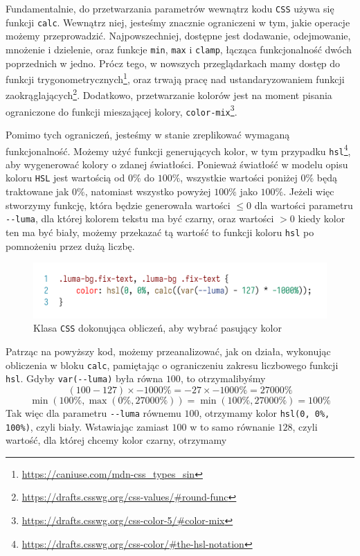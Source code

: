 \documentclass[licencjacka]{pracadypl}
\begin{document}
Fundamentalnie, do przetwarzania parametrów wewnątrz kodu \texttt{CSS} używa się funkcji \texttt{calc}. Wewnątrz niej, jesteśmy znacznie ograniczeni w tym, jakie operacje możemy przeprowadzić. Najpowszechniej, dostępne jest dodawanie, odejmowanie, mnożenie i dzielenie, oraz funkcje \texttt{min}, \texttt{max} i \texttt{clamp}, łącząca funkcjonalność dwóch poprzednich w jedno. Prócz tego, w nowszych przeglądarkach mamy dostęp do funkcji trygonometrycznych\footnote{\url{https://caniuse.com/mdn-css_types_sin}}, oraz trwają pracę nad ustandaryzowaniem funkcji zaokrąglających\footnote{\url{https://drafts.csswg.org/css-values/\#round-func}}. Dodatkowo, przetwarzanie kolorów jest na moment pisania ograniczone do funkcji mieszającej kolory, \texttt{color-mix}\footnote{\url{https://drafts.csswg.org/css-color-5/\#color-mix}}.

Pomimo tych ograniczeń, jesteśmy w stanie zreplikować wymaganą funkcjonalność. Możemy użyć funkcji generujących kolor, w tym przypadku \texttt{hsl}\footnote{\url{https://drafts.csswg.org/css-color/\#the-hsl-notation}}, aby wygenerować kolory o zdanej światłości. Ponieważ światłość w modelu opisu koloru \texttt{HSL} jest wartością od $0\%$ do $100\%$, wszystkie wartości poniżej $0\%$ będą traktowane jak $0\%$, natomiast wszystko powyżej $100\%$ jako $100\%$. Jeżeli więc stworzymy funkcję, która będzie generowała wartości $\leq 0$ dla wartości parametru \texttt{-\.-luma}, dla której kolorem tekstu ma być czarny, oraz wartości $> 0$ kiedy kolor ten ma być biały, możemy przekazać tą wartość to funkcji koloru \texttt{hsl} po pomnożeniu przez dużą liczbę.

\begin{figure}[H]
  \centering
  \includegraphics[width=\linewidth]{images/code-css-luma-calc.png}
  \caption{Klasa \texttt{CSS} dokonująca obliczeń, aby wybrać pasujący kolor}
  \label{fig:css-css-luma-calc}
\end{figure}

Patrząc na powyższy kod, możemy przeanalizować, jak on działa, wykonując obliczenia w bloku \texttt{calc}, pamiętając o ograniczeniu zakresu liczbowego funkcji \texttt{hsl}. Gdyby \texttt{var(-\.-luma)} była równa $100$, to otrzymalibyśmy
\[
  \left(100-127\right) \times -1000\% = -27 \times -1000\% = 27000\%
\]
\[
  \min\left(100\%, \max\left(0\%, 27000\%\right)\right) = \min\left(100\%, 27000\%\right) = 100\%
\]
Tak więc dla parametru \texttt{-\.-luma} równemu $100$, otrzymamy kolor \texttt{hsl(0, 0\%, 100\%)}, czyli biały. Wstawiając zamiast $100$ w to samo równanie $128$, czyli wartość, dla której chcemy kolor czarny, otrzymamy
\end{document}
